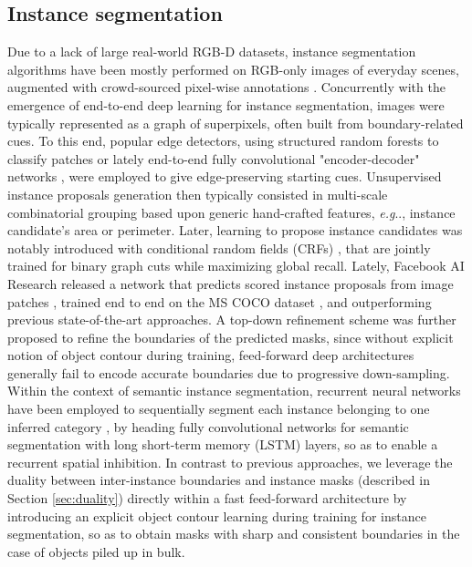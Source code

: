 \documentclass[runningheads,a4paper]{llncs}
\makeatletter
\DeclareRobustCommand\onedot{\futurelet\@let@token\@onedot}
\newcommand*\@onedot{\ifx\@let@token.\else.\null\fi\xspace}
\newcommand*\eg{\emph{e.g}\onedot} \newcommand*\Eg{\emph{E.g}\onedot}
\makeatother
\begin{document}
\subsection{Instance segmentation}

Due to a lack of large real-world RGB-D datasets, instance segmentation algorithms have been mostly performed on RGB-only images of everyday scenes, augmented with crowd-sourced pixel-wise annotations \cite{LinMBHPRDZ14}. Concurrently with the emergence of end-to-end deep learning for instance segmentation, images were typically represented as a graph of superpixels, often built from boundary-related cues. To this end, popular edge detectors, using structured random forests to classify patches \cite{ZitnickD14} or lately end-to-end fully convolutional "encoder-decoder" networks \cite{Yang2016CEDN}, were employed to give edge-preserving starting cues. Unsupervised instance proposals generation then typically consisted in multi-scale combinatorial grouping \cite{Pont-TusetABMM15} based upon generic hand-crafted features, \eg, instance candidate's area or perimeter. Later, learning to propose instance candidates was notably introduced with conditional random fields (CRFs) \cite{KrahenbuhlK15}, that are jointly trained for binary graph cuts while maximizing global recall. Lately, Facebook AI Research released a network that predicts scored instance proposals from image patches \cite{PinheiroCD15}, trained end to end on the MS COCO dataset \cite{LinMBHPRDZ14}, and outperforming previous state-of-the-art approaches. A top-down refinement scheme was further proposed \cite{SharpMask} to refine the boundaries of the predicted masks, since without explicit notion of object contour during training, feed-forward deep architectures generally fail to encode accurate boundaries due to progressive down-sampling. Within the context of semantic instance segmentation, recurrent neural networks have been employed to sequentially segment each instance belonging to one inferred category \cite{RomeraParedes2016}, by heading fully convolutional networks for semantic segmentation with long short-term memory (LSTM) layers, so as to enable a recurrent spatial inhibition. In contrast to previous approaches, we leverage the duality between inter-instance boundaries and instance masks (described in Section \ref{sec:duality}) directly within a fast feed-forward architecture by introducing an explicit object contour learning during training for instance segmentation, so as to obtain masks with sharp and consistent boundaries in the case of objects piled up in bulk.
\end{document}
